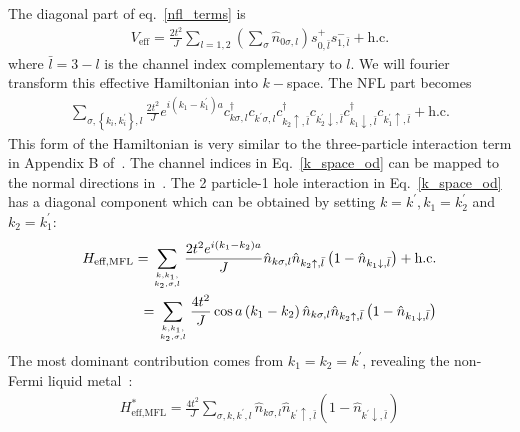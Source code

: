 \documentclass[reprint,prb,superscriptaddress]{revtex4-2}
\begin{document}
The diagonal part of eq.~\ref{nfl_terms} is
\begin{equation}\begin{aligned}
	V_\text{eff} = \frac{2t^2}{J}\sum_{l=1,2}\left(\sum_\sigma \hat n_{0\sigma,l}\right) s^+_{0,\bar l}s^-_{1,\bar l} + \text{h.c.}
\end{aligned}\end{equation}
where \(\bar l = 3 - l\) is the channel index complementary to \(l\). We will fourier transform this effective Hamiltonian into \(k-\)space. The NFL part becomes
\begin{equation}\begin{aligned}
	\label{k_space_od}
	\sum_{\sigma, \left\{k_i,k_i^\prime\right\},l} \frac{2t^2}{J}e^{i\left(k_1 - k_1^\prime\right)a}c^\dagger_{k\sigma,l}c_{k^\prime\sigma,l}c^\dagger_{k_2 \uparrow, \bar l}c_{k_2^\prime \downarrow,\bar l}c^\dagger_{k_1 \downarrow,\bar l}c_{k_1^\prime \uparrow, \bar l} + \text{h.c.} 
\end{aligned}\end{equation}
This form of the Hamiltonian is very similar to the three-particle interaction term in Appendix B of~\cite{anirbanmott1}. The channel indices in Eq.~\ref{k_space_od} can be mapped to the normal directions in~\cite{anirbanmott1}. The 2 particle-1 hole interaction in Eq.~\ref{k_space_od} has a diagonal component which can be obtained by setting \(k=k^\prime, k_1 = k_2^\prime\) and \(k_2 = k_1^\prime\):
\begin{equation}\begin{aligned}
	H_\text{eff,MFL} = \sum_{k, k_1, \atop{k_2,\sigma,  l}} \frac{2t^2e^{i\left(k_1 - k_2\right)a}}{J} \hat n_{k\sigma,l} \hat n_{k_2 \uparrow, \bar l}\left(1 - \hat n_{k_1 \downarrow,\bar l}\right) + \text{h.c.}\\
	= \sum_{k, k_1, \atop{k_2,\sigma,  l}} \frac{4t^2}{J} \cos a\left(k_1 - k_2\right)  \hat n_{k\sigma,l} \hat n_{k_2 \uparrow, \bar l}\left(1 - \hat n_{k_1 \downarrow,\bar l}\right)
\end{aligned}\end{equation}
The most dominant contribution comes from \(k_1 = k_2 = k^\prime\), revealing the non-Fermi liquid metal~\cite{cox_jarrell_two_channel_rev,andrei_jerez_1995}:
\begin{equation}\begin{aligned}
	\label{mfl_large}
	H^*_\text{eff,MFL} = \frac{4t^2}{J} \sum_{\sigma, k, k^\prime, l} \hat n_{k\sigma,l} \hat n_{k^\prime \uparrow, \bar l}\left(1 - \hat n_{k^\prime \downarrow,\bar l}\right)
\end{aligned}\end{equation}
\end{document}
